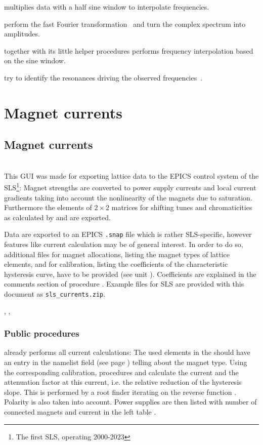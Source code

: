 \documentclass[12pt]{article}
\newcommand\code[1]{{\tt #1}}
\newcommand\guico[1]{{\color{blue}\code{#1}}}
\newcommand{\unico}[1]{{\color{burntorange}\code{#1}}}
\newcommand{\opagui}[1]{\colorbox{blue!20}{{\color{black}\code{#1}}}}
\newcommand{\oguih}[2]{\subsection{\label{#2}#1}{\Huge\opagui{#2}}\\}
\newcommand{\ogui}[1]{\hyperref[#1]{\opagui{#1}}}
\newcommand{\opauni}[1]{\colorbox{orange!30}{{\color{black}\code{#1}}}}
\newcommand{\ouni}[1]{\hyperref[#1]{\opauni{#1}}}
\newcommand{\uses}[1]{\flushleft {\bf Uses:} #1}
\newcommand{\desc}[1]{#1}
\newcommand{\ppro}[1]{\subsubsection*{Public procedures} #1}
\begin{document}
\unico{SineWindow} multiplies data with a half sine window to interpolate frequencies.

\unico{TwoFFT,FOUR1,FFTtoAmpFTmax} perform the fast Fourier transformation~\cite{numrec} and turn the complex spectrum into amplitudes.

\unico{FindPeaks} together with its little helper procedures performs frequency interpolation based on the sine window.

\unico{ResoGuess,GuessRes} try to identify the resonances driving the observed frequencies~\cite{jbthesis}.






\section{\label{secelse}Magnet currents}



\oguih{Magnet currents}{opacurrents}

\desc{This GUI was made for exporting lattice data to the EPICS control system of the SLS\footnote{The first SLS, operating 2000-2023}: Magnet strengths are converted to power supply currents and local current gradients taking into account the nonlinearity of the magnets due to saturation. Furthermore the elements of $2\times 2$ matrices for shifting tunes and chromaticities as calculated by \ogui{otunematrix} and \ogui{opachroma} are exported. 

Data are exported to an EPICS  \code{.snap} file which is rather SLS-specific, however features like current calculation may be of general interest. In order to do so, additional files for magnet allocations, listing the magnet types of lattice elements, and for calibration, listing the coefficients of the characteristic hysteresis curve, have to be provided (see unit \ouni{latfilelib}). Coefficients are explained in the comments section of procedure \guico{getKfromI}. Example files for SLS are provided with this document as \code{sls\_currents.zip}. 
}

\uses{\ouni{globlib}, \ouni{mathlib}, \ouni{comauxlib}}

\ppro{
\guico{Start} already performs all current calculations: The used elements in the \unico{Ella} should have an entry in the namelist field (see page \pageref{namelist}) telling about the magnet type. Using the corresponding calibration, procedures  \guico{getIfromK} and \guico{getdIdKfac} calculate the current and the attenuation factor at this current, i.e. the relative reduction of the hysteresis slope. This is performed by a root finder iterating on the reverse function \guico{getKfromI}. Polarity is also taken into account. Power supplies are then listed with number of connected magnets and current in the left table \guico{cgrid}. 
}
\end{document}
